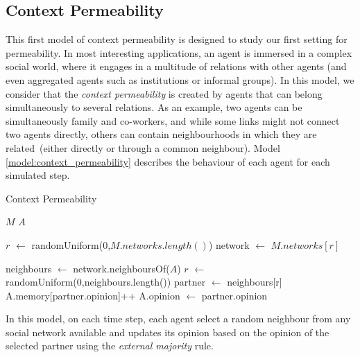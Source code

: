 \documentclass[preprint,number]{elsarticle}
\begin{document}
	\subsection{Context Permeability}
\noindent This first model of context permeability \cite{Antunes2007,Antunes2010} is designed to study our first setting for permeability. In most interesting applications, an agent is immersed in a complex social world, where it engages in a multitude of relations with other agents (and even aggregated agents such as institutions or informal groups). In this model, we consider that the \textit{context permeability} is created by agents that can belong simultaneously to several relations. As an example, two agents can be simultaneously family and co-workers, and while some links might not connect two agents directly, others can contain neighbourhoods in which they are related~(either directly or through a common neighbour). Model \ref{model:context_permeability} describes the behaviour of each agent for each simulated step.
	\begin{algorithm}[H]
		\caption{Context Permeability}
		\label{model:context_permeability}
		\begin{algorithmic}
			\vspace{0.5em}
			\STATE $M$ 
			\STATE $A$ 
			\\ \hrulefill 
			
			\STATE{}
			\STATE $r$ $\leftarrow$ randomUniform(0,$ M.networks.length() $)
			\STATE network $\leftarrow$ $M.networks[r]$
			
			\STATE
			\STATE {}
			\STATE neighbours $\leftarrow$ network.neighboursOf($A$) 
			\STATE $r$ $\leftarrow$ randomUniform(0,neighbours.length())
			\STATE partner $\leftarrow$ neighbours[r]
			\STATE
			\STATE {}
			\STATE {}
			\STATE A.memory[partner.opinion]++
			\STATE A.opinion $\leftarrow$ partner.opinion
			\ENDIF
		\end{algorithmic}
	\end{algorithm}
	In this model, on each time step, each agent select a random neighbour from any 
	social network available and updates its opinion based on the opinion of the selected partner using the \textit{external majority} rule. 
	
\end{document}
